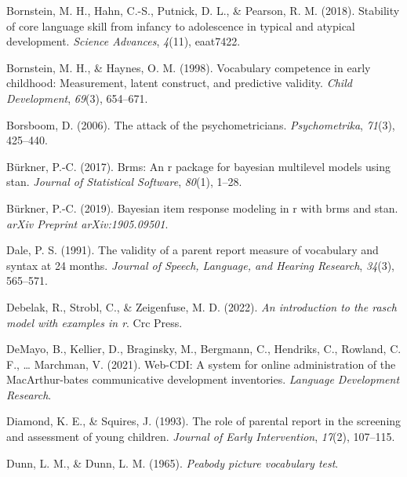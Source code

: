 \documentclass[
  man,floatsintext]{apa6}
\newlength{\cslhangindent}
\newlength{\cslentryspacingunit} %
\newenvironment{CSLReferences}[2] %
 {%
  \setlength{\parindent}{0pt}
  \ifodd #1
  \let\oldpar\par
  \def\par{\hangindent=\cslhangindent\oldpar}
  \fi
  \setlength{\parskip}{#2\cslentryspacingunit}
 }%
 {}
\begin{document}
\begin{CSLReferences}{1}{0}
\leavevmode{}%
Bornstein, M. H., Hahn, C.-S., Putnick, D. L., \& Pearson, R. M. (2018). Stability of core language skill from infancy to adolescence in typical and atypical development. \emph{Science Advances}, \emph{4}(11), eaat7422.

\leavevmode{}%
Bornstein, M. H., \& Haynes, O. M. (1998). Vocabulary competence in early childhood: Measurement, latent construct, and predictive validity. \emph{Child Development}, \emph{69}(3), 654--671.

\leavevmode{}%
Borsboom, D. (2006). The attack of the psychometricians. \emph{Psychometrika}, \emph{71}(3), 425--440.

\leavevmode{}%
Bürkner, P.-C. (2017). Brms: An r package for bayesian multilevel models using stan. \emph{Journal of Statistical Software}, \emph{80}(1), 1--28.

\leavevmode{}%
Bürkner, P.-C. (2019). Bayesian item response modeling in r with brms and stan. \emph{arXiv Preprint arXiv:1905.09501}.

\leavevmode{}%
Dale, P. S. (1991). The validity of a parent report measure of vocabulary and syntax at 24 months. \emph{Journal of Speech, Language, and Hearing Research}, \emph{34}(3), 565--571.

\leavevmode{}%
Debelak, R., Strobl, C., \& Zeigenfuse, M. D. (2022). \emph{An introduction to the rasch model with examples in r}. Crc Press.

\leavevmode{}%
DeMayo, B., Kellier, D., Braginsky, M., Bergmann, C., Hendriks, C., Rowland, C. F., \ldots{} Marchman, V. (2021). Web-CDI: A system for online administration of the MacArthur-bates communicative development inventories. \emph{Language Development Research}.

\leavevmode{}%
Diamond, K. E., \& Squires, J. (1993). The role of parental report in the screening and assessment of young children. \emph{Journal of Early Intervention}, \emph{17}(2), 107--115.

\leavevmode{}%
Dunn, L. M., \& Dunn, L. M. (1965). \emph{Peabody picture vocabulary test}.


\end{CSLReferences}
\end{document}

